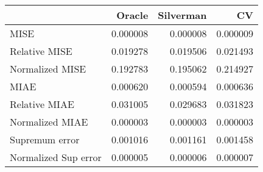 \begin{tabular}{lrrr}
  \toprule
 & Oracle & Silverman & CV \\ 
  \midrule
MISE & 0.000008 & 0.000008 & 0.000009 \\ 
  Relative MISE & 0.019278 & 0.019506 & 0.021493 \\ 
  Normalized MISE & 0.192783 & 0.195062 & 0.214927 \\ 
  MIAE & 0.000620 & 0.000594 & 0.000636 \\ 
  Relative MIAE & 0.031005 & 0.029683 & 0.031823 \\ 
  Normalized MIAE & 0.000003 & 0.000003 & 0.000003 \\ 
  Supremum error & 0.001016 & 0.001161 & 0.001458 \\ 
  Normalized Sup error & 0.000005 & 0.000006 & 0.000007 \\ 
   \bottomrule
\end{tabular}
